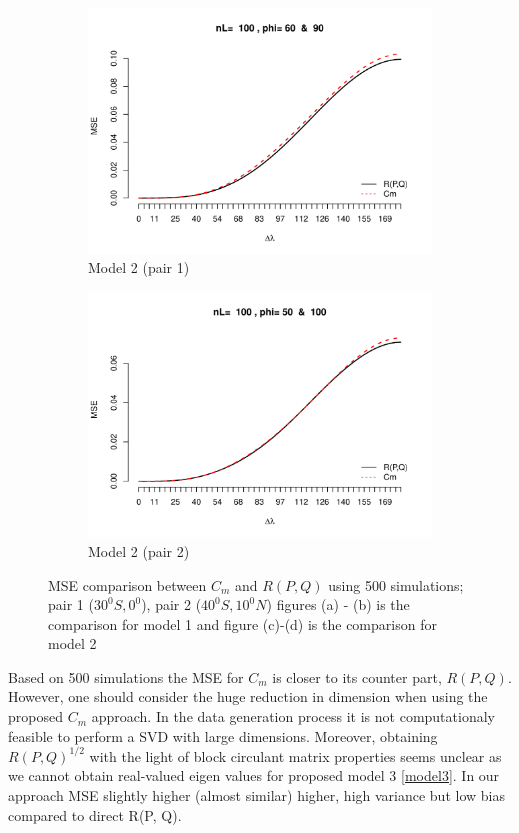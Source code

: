 \begin{figure}[H]
\begin{subfigure}{.5\textwidth}
		\includegraphics[width=1\linewidth]{graphs/MSE_comparison_model2_60_90}
		\caption{Model 2 (pair 1)}
		\label{fig:mse3}
	\end{subfigure}
		\begin{subfigure}{.5\textwidth}
		\centering
		\includegraphics[width=1\linewidth]{graphs/MSE_comparison_model2_50_100}
		\caption{Model 2 (pair 2) }
		\label{fig:mes4}
	\end{subfigure}
	\caption[]{MSE comparison between $C_m$ and $R(P,Q)$ using 500 simulations; pair 1 ($30^0S,0^0$), pair 2 ($40^0S, 10^0N$) figures (a) - (b) is the comparison for model 1 and figure (c)-(d) is the comparison for model 2 }
	\label{mse_comparison}
\end{figure}

Based on 500 simulations the MSE for $C_m$ is closer to its counter part, $R(P,Q)$. However, one should consider the huge reduction in dimension when using the proposed $C_m$ approach. In the data generation process it is not computationaly feasible to perform a SVD with large dimensions.  Moreover, obtaining $R(P,Q)^{1/2}$ with the light of block circulant matrix properties seems unclear as we cannot obtain real-valued eigen values for proposed model 3 \eqref{model3}. In our approach MSE slightly higher (almost similar) higher, high variance but low bias compared to direct R(P, Q).  

